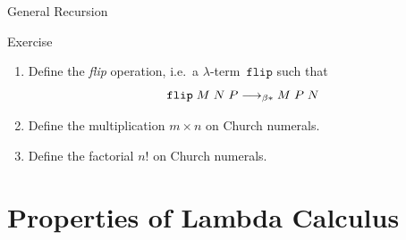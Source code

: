 \begin{frame}[allowframebreaks]{General Recursion}
\begin{block}{Exercise}
\begin{enumerate}
  \item Define the \emph{flip} operation, i.e.\ a $\lambda$-term~$\mathtt{flip}$
    such that
    \[
      \mathtt{flip}\;M\;N\;P
      \longrightarrow_{\beta*} M\;P\;N
    \]
  \item Define the multiplication $m \times n$ on Church numerals.
  \item Define the factorial $n!$ on Church numerals.
\end{enumerate}
\end{block}

\end{frame}
\section{Properties of Lambda Calculus}
